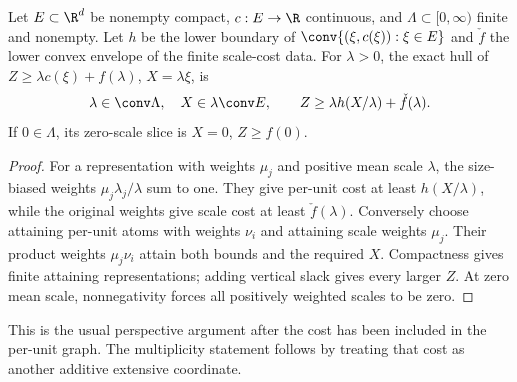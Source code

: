 \begin{proposition}\label{prop:scale-perspective}
Let $E\subset\R^d$ be nonempty compact, $c:E\to\R$ continuous, and
$\Lambda\subset[0,\infty)$ finite and nonempty. Let $h$ be the lower
boundary of $\conv\{(\xi,c(\xi)):\xi\in E\}$ and $\check f$ the lower
convex envelope of the finite scale-cost data. For $\lambda>0$, the exact
hull of $Z\ge\lambda c(\xi)+f(\lambda)$, $X=\lambda\xi$, is
\[
 \lambda\in\conv\Lambda,\quad X\in\lambda\conv E,\qquad
 Z\ge\lambda h(X/\lambda)+\check f(\lambda).
\]
If $0\in\Lambda$, its zero-scale slice is $X=0$, $Z\ge f(0)$.
\end{proposition}
\begin{proof}
For a representation with weights $\mu_j$ and positive mean scale
$\lambda$, the size-biased weights $\mu_j\lambda_j/\lambda$ sum to one.
They give per-unit cost at least $h(X/\lambda)$, while the original
weights give scale cost at least $\check f(\lambda)$. Conversely choose
attaining per-unit atoms with weights $\nu_i$ and attaining scale weights
$\mu_j$. Their product weights $\mu_j\nu_i$ attain both bounds and the
required $X$. Compactness gives finite attaining representations; adding
vertical slack gives every larger $Z$. At zero mean scale, nonnegativity
forces all positively weighted scales to be zero.
\end{proof}
This is the usual perspective argument after the cost has been included
in the per-unit graph. The multiplicity statement follows by treating
that cost as another additive extensive coordinate.

